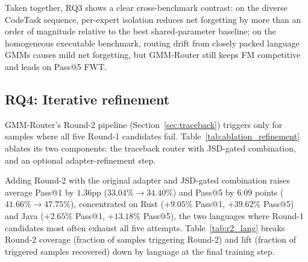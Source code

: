 Taken together, RQ3 shows a clear cross-benchmark contrast: on the diverse CodeTask sequence, per-expert isolation reduces net forgetting by more than an order of magnitude relative to the best shared-parameter baseline; on the homogeneous executable benchmark, routing drift from closely packed language GMMs causes mild net forgetting, but GMM-Router still keeps FM competitive and leads on Pass@5 FWT.

\subsection{RQ4: Iterative refinement}
\label{sec:refinement}

GMM-Router's Round-2 pipeline (Section~\ref{sec:traceback}) triggers only for samples where all five Round-1 candidates fail. Table~\ref{tab:ablation_refinement} ablates its two components: the traceback router with JSD-gated combination, and an optional adapter-refinement step.

\begin{table}[t]
\centering
\caption{Ablation of Round-2 pipeline components on the executable benchmark. Best averages in bold.}
\label{tab:ablation_refinement}
\small
{}
\end{table}

Adding Round-2 with the original adapter and JSD-gated combination raises average Pass@1 by $1.36$pp ($33.04\%\to34.40\%$) and Pass@5 by $6.09$ points ($41.66\%\to47.75\%$), concentrated on Rust ($+9.05\%$ Pass@1, $+39.62\%$ Pass@5) and Java ($+2.65\%$ Pass@1, $+13.18\%$ Pass@5), the two languages where Round-1 candidates most often exhaust all five attempts. Table~\ref{tab:r2_lang} breaks Round-2 coverage (fraction of samples triggering Round-2) and lift (fraction of triggered samples recovered) down by language at the final training step.

